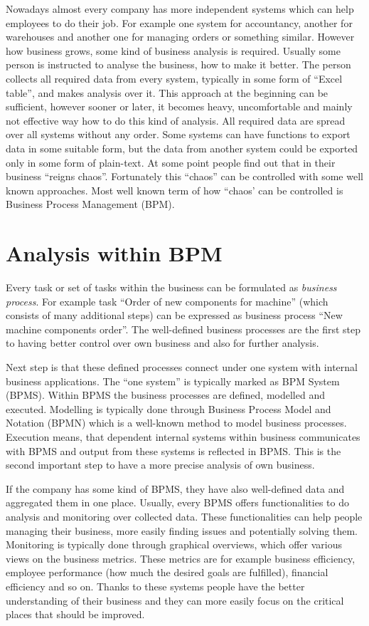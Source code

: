 Nowadays almost every company has more independent systems which can help employees to do their job. For example one system for accountancy, another for warehouses and another one for managing orders or something similar. However how business grows, some kind of business analysis is required. Usually some person is instructed to analyse the business, how to make it better. The person collects all required data from every system, typically in some form of  ``Excel table'', and makes analysis over it. This approach at the beginning can be sufficient, however sooner or later, it becomes heavy, uncomfortable and mainly not effective way how to do this kind of analysis. All required data are spread over all systems without any order. Some systems can have functions to export data in some suitable form, but the data from another system could be exported only in some form of plain-text. At some point people find out that in their business ``reigns chaos''. Fortunately this ``chaos'' can be controlled with some well known approaches. Most well known term of how ``chaos' can be controlled is Business Process Management (BPM).

\section{Analysis within BPM}
Every task or set of tasks within the business can be formulated as \textit{business process}. For example task ``Order of new components for machine'' (which consists of many additional steps)  can be expressed as business process ``New machine components order''. The well-defined business processes are the first step to having better control over own business and also for further analysis. 

Next step is that these defined processes connect under one system with internal business applications. The ``one system'' is typically marked as BPM System (BPMS). Within BPMS the business processes are defined, modelled and executed. Modelling is typically done through Business Process Model and Notation (BPMN) which is a well-known method to model business processes. Execution means, that dependent internal systems within business communicates with BPMS and output from these systems is reflected in BPMS. This is the second important step to have a more precise analysis of own business.

If the company has some kind of BPMS, they have also well-defined data and aggregated them in one place. Usually, every BPMS offers functionalities to do analysis and monitoring over collected data. These functionalities can help people managing their business, more easily finding issues and potentially solving them. Monitoring is typically done through graphical overviews, which offer various views on the business metrics. These metrics are for example business efficiency, employee performance (how much the desired goals are fulfilled), financial efficiency and so on. Thanks to these systems people have the better understanding of their business and they can more easily focus on the critical places that should be improved.

